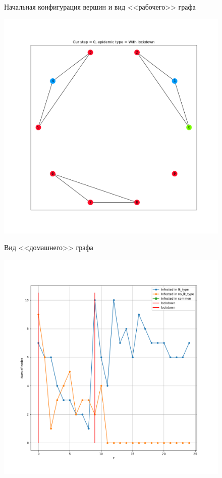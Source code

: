 \begin{figure}[h]
\begin{center}
\begin{minipage}{0.49\linewidth}
			\centering
			Начальная конфигурация вершин и вид <<рабочего>> графа
		\end{minipage}
		\begin{minipage}{0.49\linewidth}
			\includegraphics[width=\linewidth, keepaspectratio]{../figs/evidence2/start_with_ld}
			
			\centering
			Вид <<домашнего>> графа
		\end{minipage}
		\end{center}
	
		\begin{center}
			\begin{minipage}{0.49\linewidth}
				\includegraphics[width=\linewidth, keepaspectratio]{../figs/evidence2/tracks}
				

\end{minipage}
\end{center}
\end{figure}
